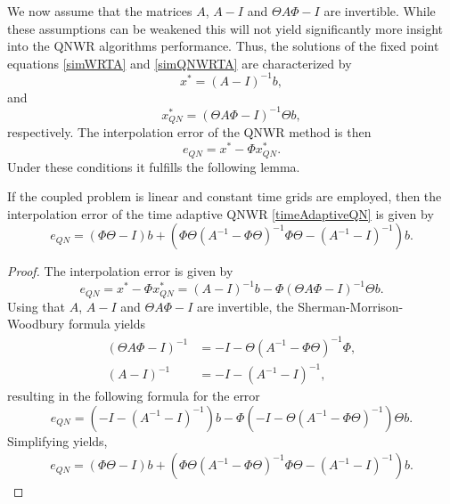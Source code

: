 We now assume that the matrices $A$, $A-I$ and $\Theta A \Phi  - I$ are invertible. While these assumptions can be weakened this will not yield significantly more insight into the QNWR algorithms performance. Thus, the solutions of the fixed point equations \eqref{simWRTA} and \eqref{simQNWRTA} are characterized by 
\begin{equation*}
	x^* = (A - I)^{-1}b,
\end{equation*} 
and 
\begin{equation*}
	x^*_{QN} = (\Theta A \Phi - I)^{-1} \Theta b,
\end{equation*}  
respectively. The interpolation error of the QNWR method is then
\begin{equation*}
e_{QN} = x^* -  \Phi  x_{QN}^{*}.
\end{equation*}
Under these conditions it fulfills the following lemma.

\begin{lemma} \label{interpError}
If the coupled problem is linear and constant time grids are employed, then the interpolation error of the time adaptive QNWR \eqref{timeAdaptiveQN} is given by
\begin{equation}
e_{QN} = ( \Phi \Theta - I )b + ( \Phi  \Theta  (A^{-1} - \Phi \Theta )^{-1} \Phi \Theta  -(A^{-1}-I)^{-1} )b.
\end{equation} 
\end{lemma}
\begin{proof}
	The interpolation error is given by 
	\begin{equation*}
		e_{QN} = x^* -  \Phi  x_{QN}^{*} = (A- I)^{-1}b -  \Phi ( \Theta A \Phi  - I)^{-1} \Theta b.
	\end{equation*}
	Using that $A$, $A-I$ and $\Theta A \Phi  - I$ are invertible, the Sherman-Morrison-Woodbury formula yields
	\begin{align*}
		( \Theta A \Phi  - I)^{-1} &=  - I -  \Theta (A^{-1} - \Phi  \Theta )^{-1} \Phi,\\
		(A-I)^{-1} &= -I - (A^{-1}-I)^{-1},
	\end{align*}
	resulting in the following formula for the error
	\begin{equation*}
		e_{QN} = \left(-I - (A^{-1}-I)^{-1}\right)b - \Phi \left(- I  - \Theta (A^{-1} - \Phi  \Theta )^{-1} \right) \Theta b. 
	\end{equation*} 
	Simplifying yields,
	\begin{align*}
		e_{QN} = ( \Phi \Theta - I )b + ( \Phi  \Theta  (A^{-1} - \Phi \Theta )^{-1} \Phi \Theta  -(A^{-1}-I)^{-1} )b. 
	\end{align*} 
\end{proof}

